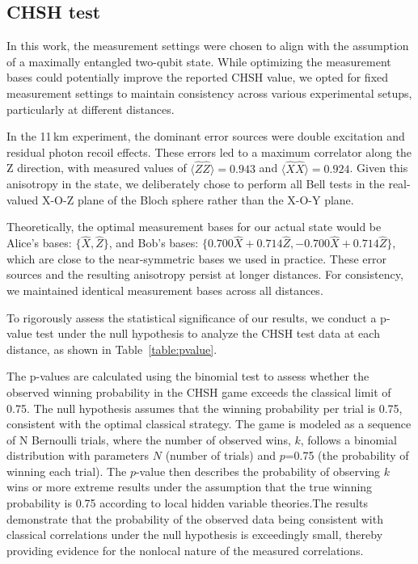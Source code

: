 \documentclass[aps,reprint,showpacs,superscriptaddress]{revtex4-2}
\begin{document}
\subsection{CHSH test}
{
	In this work, the measurement settings were chosen to align with the assumption of a maximally entangled two-qubit state. While optimizing the measurement bases could potentially improve the reported CHSH value, we opted for fixed measurement settings to maintain consistency across various experimental setups, particularly at different distances.

	In the 11\,km experiment, the dominant error sources were double excitation and residual photon recoil effects. These errors led to a maximum correlator along the Z direction, with measured values of $\langle \hat{Z} \hat{Z} \rangle = 0.943$ and $\langle \hat{X} \hat{X} \rangle = 0.924$. Given this anisotropy in the state, we deliberately chose to perform all Bell tests in the real-valued X-O-Z plane of the Bloch sphere rather than the X-O-Y plane.

	Theoretically, the optimal measurement bases for our actual state would be Alice's bases: $\{\hat{X},\hat{Z}\}$, and Bob's bases: $\{0.700\hat{X}+0.714\hat{Z},-0.700\hat{X}+0.714\hat{Z}\}$, which are close to the near-symmetric bases we used in practice. These error sources and the resulting anisotropy persist at longer distances. For consistency, we maintained identical measurement bases across all distances.

	To rigorously assess the statistical significance of our results, we conduct a p-value test under the null hypothesis to analyze the CHSH test data at each distance, as shown in Table~\ref{table:pvalue}.

	The p-values are calculated using the binomial test to assess whether the observed winning probability in the CHSH game exceeds the classical limit of 0.75. The null hypothesis assumes that the winning probability per trial is 0.75, consistent with the optimal classical strategy. The game is modeled as a sequence of N Bernoulli trials, where the number of observed wins, $k$, follows a binomial distribution with parameters $N$ (number of trials) and $p$=0.75 (the probability of winning each trial). The $p$-value then describes the probability of observing $k$ wins or more extreme results under the assumption that the true winning probability is 0.75 according to local hidden variable theories.The results demonstrate that the probability of the observed data being consistent with classical correlations under the null hypothesis is exceedingly small, thereby providing evidence for the nonlocal nature of the measured correlations.

}
\end{document}

